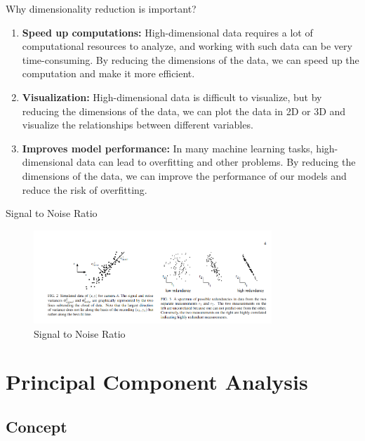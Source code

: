 \documentclass{beamer}
\begin{document}
\begin{frame}{Why dimensionality reduction is important?}
    \begin{enumerate}
        \item \textbf{Speed up computations:} High-dimensional data requires a lot of computational resources to analyze, and working with such data can be very time-consuming. By reducing the dimensions of the data, we can speed up the computation and make it more efficient.
        \item \textbf{Visualization:} High-dimensional data is difficult to visualize, but by reducing the dimensions of the data, we can plot the data in 2D or 3D and visualize the relationships between different variables.
        \item \textbf{Improves model performance:} In many machine learning tasks, high-dimensional data can lead to overfitting and other problems. By reducing the dimensions of the data, we can improve the performance of our models and reduce the risk of overfitting.
    \end{enumerate}
\end{frame}

\begin{frame}{Signal to Noise Ratio}
    \begin{figure}
        \centering
        \includegraphics[width=0.8\textwidth]{SNR.png}
        \caption{Signal to Noise Ratio}
        \label{fig:signal_noise_ratio}
    \end{figure}
\end{frame}

\section{Principal Component Analysis}
\subsection{Concept}
\end{document}

